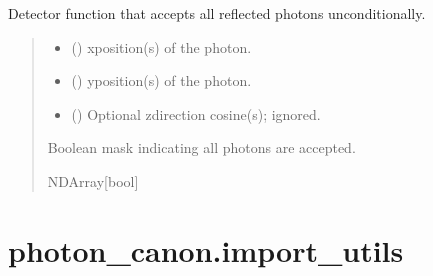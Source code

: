 \documentclass[letterpaper,10pt,english]{sphinxmanual}
\begin{document}
\begin{fulllineitems}
\label{\detokenize{generated/photon_canon.hardware:photon_canon.hardware.total_acceptor}}
\pysigstartsignatures
\pysiglinewithargsret
{}
{\sphinxparamcomma {}\sphinxparamcomma {}}
{}
\pysigstopsignatures
\sphinxAtStartPar
Detector function that accepts all reflected photons unconditionally.
\begin{quote}\begin{description}
\begin{itemize}
\item {} 
\sphinxAtStartPar
{} () \textendash{} x\sphinxhyphen{}position(s) of the photon.

\item {} 
\sphinxAtStartPar
{} () \textendash{} y\sphinxhyphen{}position(s) of the photon.

\item {} 
\sphinxAtStartPar
{} (\sphinxstyleliteralemphasis{\sphinxupquote{{[}}}\sphinxstyleliteralemphasis{\sphinxupquote{{]}}}) \textendash{} Optional z\sphinxhyphen{}direction cosine(s); ignored.

\end{itemize}

\sphinxAtStartPar
Boolean mask indicating all photons are accepted.

\sphinxAtStartPar
NDArray{[}bool{]}

\end{description}\end{quote}

\end{fulllineitems}


\sphinxstepscope


\section{photon\_canon.import\_utils}
\label{\detokenize{generated/photon_canon.import_utils:module-photon_canon.import_utils}}\label{\detokenize{generated/photon_canon.import_utils:photon-canon-import-utils}}\label{\detokenize{generated/photon_canon.import_utils::doc}}
\sphinxstepscope
\end{document}
